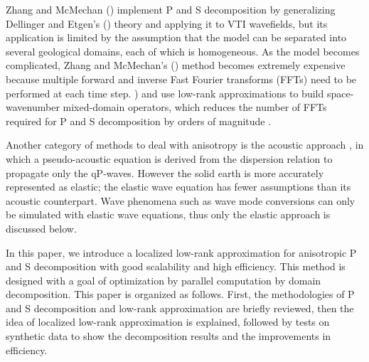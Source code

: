 \documentclass[manuscript,ulem,graphix,revised]{geophysics}
\begin{document}

Zhang and McMechan (\citeyear{zhang10}) implement P and S decomposition by generalizing Dellinger and Etgen's (\citeyear{dellinger90}) theory and applying it to VTI wavefields, but its application is limited by the assumption that the model can be separated into several geological domains, each of which is homogeneous. As the model becomes complicated, Zhang and McMechan's (\citeyear{zhang10}) method becomes extremely expensive because multiple forward and inverse Fast Fourier transforms (FFTs) need to be performed at each time step. \citet{cheng14}) and \citet{Sripanich16} use low-rank approximations to build space-wavenumber mixed-domain operators, which reduces the number of FFTs required for P and S decomposition by orders of magnitude \citep{cheng16,sun16}. 

Another category of methods to deal with anisotropy is the acoustic approach \citep{alkhalifah98,alkhalifah00}, in which a pseudo-acoustic equation is derived from the dispersion relation to propagate only the qP-waves. However the solid earth is more accurately represented as elastic; the elastic wave equation has fewer assumptions than its acoustic counterpart. Wave phenomena such as wave mode conversions can only be simulated with elastic wave equations, thus only the elastic approach is discussed below.

In this paper, we introduce a localized low-rank approximation for anisotropic P and S decomposition with good scalability and high efficiency. This method is designed with a goal of optimization by parallel computation by domain decomposition. 
This paper is organized as follows. First, the methodologies of P and S decomposition and low-rank approximation are briefly reviewed, then the idea of localized low-rank approximation is explained, followed by tests on synthetic data to show the decomposition results and the improvements in efficiency. 
\end{document}

